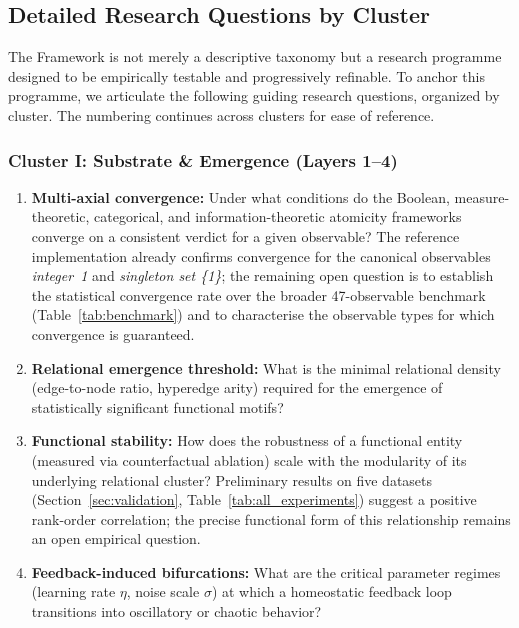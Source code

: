 \subsection{Detailed Research Questions by Cluster}
\label{subsec:detailed_rq}

The \Apeiron{} Framework is not merely a descriptive taxonomy but a research programme designed to be empirically testable and progressively refinable. To anchor this programme, we articulate the following guiding research questions, organized by cluster. The numbering continues across clusters for ease of reference.

\subsubsection{Cluster I: Substrate \& Emergence (Layers 1--4)}
\begin{enumerate}[label=RQ\arabic*:, leftmargin=2.5cm, series=rq]
    \item \textbf{Multi-axial convergence:} Under what conditions do the
Boolean, measure-theoretic, categorical, and information-theoretic
atomicity frameworks converge on a consistent verdict for a given
observable?  The reference implementation already confirms convergence
for the canonical observables \emph{integer~1} and \emph{singleton set
\{1\}}; the remaining open question is to establish the statistical
convergence rate over the broader 47-observable benchmark
(Table~\ref{tab:benchmark}) and to characterise the observable types for
which convergence is guaranteed.
    \item \textbf{Relational emergence threshold:} What is the minimal relational density (edge-to-node ratio, hyperedge arity) required for the emergence of statistically significant functional motifs?
    \item \textbf{Functional stability:} How does the robustness of a
functional entity (measured via counterfactual ablation) scale with the
modularity of its underlying relational cluster?  Preliminary results on
five datasets (Section~\ref{sec:validation}, Table~\ref{tab:all_experiments})
suggest a positive rank-order correlation; the precise functional form
of this relationship remains an open empirical question.
    \item \textbf{Feedback-induced bifurcations:} What are the critical parameter regimes (learning rate $\eta$, noise scale $\sigma$) at which a homeostatic feedback loop transitions into oscillatory or chaotic behavior?
\end{enumerate}

